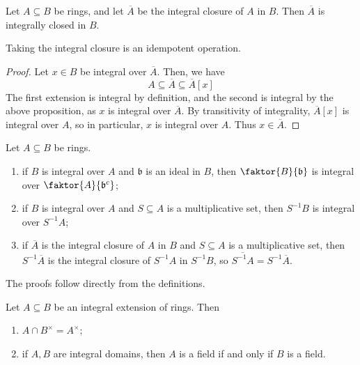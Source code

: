 \begin{lemma}
    Let \( A \subseteq B \) be rings, and let \( \overline A \) be the integral closure of \( A \) in \( B \).
    Then \( \overline A \) is integrally closed in \( B \).
\end{lemma}
Taking the integral closure is an idempotent operation.
\begin{proof}
    Let \( x \in B \) be integral over \( \overline A \).
    Then, we have
    \[ A \subseteq \overline A \subseteq \overline A[x] \]
    The first extension is integral by definition, and the second is integral by the above proposition, as \( x \) is integral over \( \overline A \).
    By transitivity of integrality, \( \overline A[x] \) is integral over \( A \), so in particular, \( x \) is integral over \( A \).
    Thus \( x \in \overline A \).
\end{proof}
\begin{proposition}
    Let \( A \subseteq B \) be rings.
    \begin{enumerate}
        \item if \( B \) is integral over \( A \) and \( \mathfrak b \) is an ideal in \( B \), then \( \faktor{B}{\mathfrak b} \) is integral over \( \faktor{A}{\mathfrak b^c} \);
        \item if \( B \) is integral over \( A \) and \( S \subseteq A \) is a multiplicative set, then \( S^{-1}B \) is integral over \( S^{-1}A \);
        \item if \( \overline A \) is the integral closure of \( A \) in \( B \) and \( S \subseteq A \) is a multiplicative set, then \( S^{-1} \overline A \) is the integral closure of \( S^{-1} A \) in \( S^{-1} B \), so \( \overline{S^{-1}A} = S^{-1}\overline A \).
    \end{enumerate}
\end{proposition}
The proofs follow directly from the definitions.
\begin{lemma}
    Let \( A \subseteq B \) be an integral extension of rings.
    Then
    \begin{enumerate}
        \item \( A \cap B^\times = A^\times \);
        \item if \( A, B \) are integral domains, then \( A \) is a field if and only if \( B \) is a field.
    \end{enumerate}
\end{lemma}
